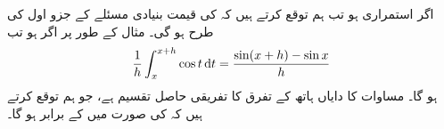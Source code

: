\\
\\
اگر  استمراری ہو تب ہم توقع کرتے ہیں کہ  کی قیمت بنیادی مسئلے کے جزو اول کی طرح   ہو گی۔ مثال کے طور پر  اگر  ہو تب
\begin{align}\label{مساوات_تکمل_کوسائن_کا_تکمل}
\frac{1}{h}\int_x^{x+h}\cos t\dif t=\frac{\sin(x+h)-\sin x}{h}
\end{align}
ہو گا۔ مساوات  کا دایاں ہاتھ  کے تفرق کا   تفریقی حاصل تقسیم ہے، جو ہم توقع کرتے ہیں کہ  کی صورت میں   کے برابر ہو گا۔

